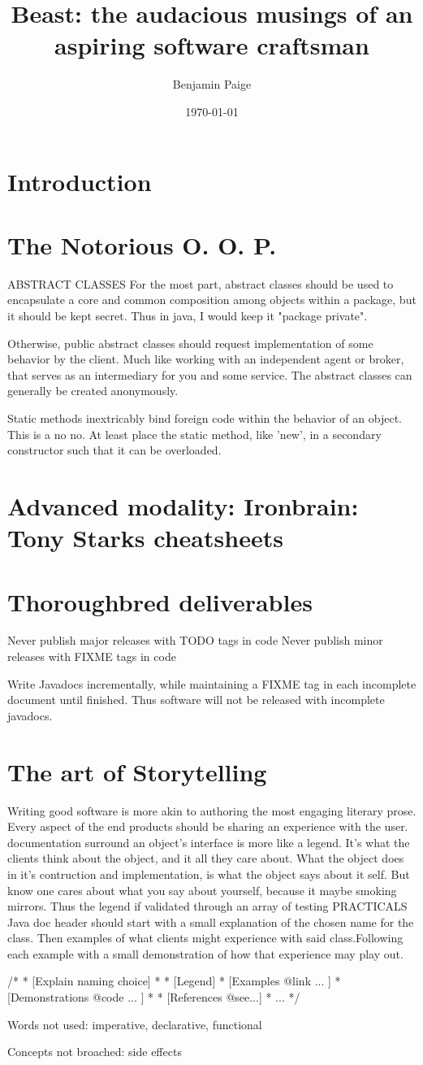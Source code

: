 \documentclass{article}
\title{Beast: the audacious musings of an aspiring software craftsman}
\author{Benjamin Paige}
\date{\today}
\begin{document}
\maketitle

\tableofcontents

\section{Introduction}

\section{The Notorious O. O. P.}
ABSTRACT CLASSES
For the most part, abstract classes should be used to encapsulate a core and common composition among objects within a package, but it should be kept secret.
Thus in java, I would keep it "package private".

Otherwise, public abstract classes should request implementation of some behavior by the client.
Much like working with an independent agent or broker, that serves as an intermediary for you and some service.
The abstract classes can generally be created anonymously. 

Static methods inextricably bind foreign code within the behavior of an object. This is a no no.  At least place the static method, like 'new', in a secondary constructor such that it can be overloaded.

\section{Advanced modality: Ironbrain: Tony Starks cheatsheets}

\section{Thoroughbred deliverables}
Never publish major releases with TODO tags in code
Never publish minor releases with FIXME tags in code

Write Javadocs incrementally, while maintaining a FIXME tag in each incomplete document until finished. 
Thus software will not be released with incomplete javadocs.

\section{The art of Storytelling}
Writing good software is more akin to authoring the most engaging literary prose. Every aspect of the end products should be sharing an experience with the user.
documentation surround an object's interface is more like a legend.  It's what the clients think about the object, and it all they care about.  What the object does in it's contruction and implementation, is what the object says about it self.  But know one cares about what you say about yourself, because it maybe smoking mirrors.  Thus the legend if validated through an array of testing
PRACTICALS
Java doc header should start with a small explanation of the chosen name for the class.  Then examples of what clients might experience with said class.Following each example with a small demonstration of how that experience may play out.

/*
 * [Explain naming choice]
 *
 * [Legend]
 *		[Examples {@link} ... ]
 *			[Demonstrations {@code} ... ]
 *
 * [References @see...]
 * ...
 */

Words not used:
imperative, declarative, functional

Concepts not broached:
side effects
\end{document}
